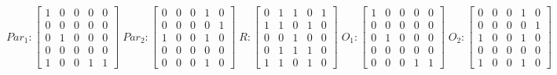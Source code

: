      $$
        Par_{1} : \begin{bmatrix}
            1 & 0 & 0 & 0 & 0 \\
            0 & 0 & 0 & 0 & 0 \\
            0 & 1 & 0 & 0 & 0 \\
			0 & 0 & 0 & 0 & 0 \\
            1 & 0 & 0 & 1 & 1 
        \end{bmatrix}
        \;
        Par_{2} : \begin{bmatrix}
            0 & 0 & 0 & 1 & 0 \\
            0 & 0 & 0 & 0 & 1 \\
            1 & 0 & 0 & 1 & 0 \\
            0 & 0 & 0 & 0 & 0 \\
            0 & 0 & 0 & 1 & 0
        \end{bmatrix}
        \;
        R : \begin{bmatrix}
            0 & 1 & 1 & 0 & 1 \\
            1 & 1 & 0 & 1 & 0 \\
            0 & 0 & 1 & 0 & 0 \\
            0 & 1 & 1 & 1 & 0 \\
            1 & 1 & 0 & 1 & 0
        \end{bmatrix}
        \;
        O_{1} : \begin{bmatrix}
            1 & 0 & 0 & 0 & 0 \\
            0 & 0 & 0 & 0 & 0 \\
            0 & 1 & 0 & 0 & 0 \\
            0 & 0 & 0 & 0 & 0 \\
            0 & 0 & 0 & 1 & 1
        \end{bmatrix}
        \;
        O_{2} : \begin{bmatrix}
            0 & 0 & 0 & 1 & 0 \\
            0 & 0 & 0 & 0 & 1 \\
            1 & 0 & 0 & 1 & 0 \\
            0 & 0 & 0 & 0 & 0 \\
            1 & 0 & 0 & 1 & 0
        \end{bmatrix}
    $$ 
